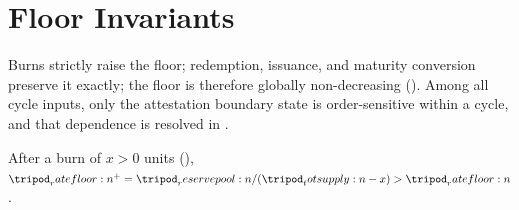 \documentclass[../main.tex]{subfiles}
\begin{document}
%
%
%

\section{Floor Invariants}
\label{sec:attestation:invariants}

Burns strictly raise the floor; redemption, issuance, and maturity conversion preserve it
exactly; the floor is therefore globally non-decreasing
(). Among all cycle inputs, only the attestation
boundary state is order-sensitive within a cycle, and that dependence is resolved in
.

\begin{proposition}
    \label{prop:invariants:burn-increases-floor}
    After a burn of $x > 0$ \liveclass{} units (),
    $\ratefloor{}^{+} = \reservepool{}/(\totsupply{} - x) > \ratefloor{}$.
\end{proposition}
\end{document}
